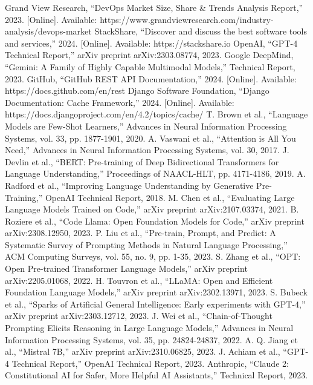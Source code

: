 \documentclass[conference]{IEEEtran}
\begin{document}
\begin{thebibliography}{00}
 Grand View Research, ``DevOps Market Size, Share \& Trends Analysis Report,'' 2023. [Online]. Available: https://www.grandviewresearch.com/industry-analysis/devops-market
 StackShare, ``Discover and discuss the best software tools and services,'' 2024. [Online]. Available: https://stackshare.io
 OpenAI, ``GPT-4 Technical Report,'' arXiv preprint arXiv:2303.08774, 2023.
 Google DeepMind, ``Gemini: A Family of Highly Capable Multimodal Models,'' Technical Report, 2023.
 GitHub, ``GitHub REST API Documentation,'' 2024. [Online]. Available: https://docs.github.com/en/rest
 Django Software Foundation, ``Django Documentation: Cache Framework,'' 2024. [Online]. Available: https://docs.djangoproject.com/en/4.2/topics/cache/
 T. Brown et al., ``Language Models are Few-Shot Learners,'' Advances in Neural Information Processing Systems, vol. 33, pp. 1877-1901, 2020.
 A. Vaswani et al., ``Attention is All You Need,'' Advances in Neural Information Processing Systems, vol. 30, 2017.
 J. Devlin et al., ``BERT: Pre-training of Deep Bidirectional Transformers for Language Understanding,'' Proceedings of NAACL-HLT, pp. 4171-4186, 2019.
 A. Radford et al., ``Improving Language Understanding by Generative Pre-Training,'' OpenAI Technical Report, 2018.
 M. Chen et al., ``Evaluating Large Language Models Trained on Code,'' arXiv preprint arXiv:2107.03374, 2021.
 B. Roziere et al., ``Code Llama: Open Foundation Models for Code,'' arXiv preprint arXiv:2308.12950, 2023.
 P. Liu et al., ``Pre-train, Prompt, and Predict: A Systematic Survey of Prompting Methods in Natural Language Processing,'' ACM Computing Surveys, vol. 55, no. 9, pp. 1-35, 2023.
 S. Zhang et al., ``OPT: Open Pre-trained Transformer Language Models,'' arXiv preprint arXiv:2205.01068, 2022.
 H. Touvron et al., ``LLaMA: Open and Efficient Foundation Language Models,'' arXiv preprint arXiv:2302.13971, 2023.
 S. Bubeck et al., ``Sparks of Artificial General Intelligence: Early experiments with GPT-4,'' arXiv preprint arXiv:2303.12712, 2023.
 J. Wei et al., ``Chain-of-Thought Prompting Elicits Reasoning in Large Language Models,'' Advances in Neural Information Processing Systems, vol. 35, pp. 24824-24837, 2022.
 A. Q. Jiang et al., ``Mistral 7B,'' arXiv preprint arXiv:2310.06825, 2023.
 J. Achiam et al., ``GPT-4 Technical Report,'' OpenAI Technical Report, 2023.
 Anthropic, ``Claude 2: Constitutional AI for Safer, More Helpful AI Assistants,'' Technical Report, 2023.
\end{thebibliography}

\vspace{12pt}
\end{document}
